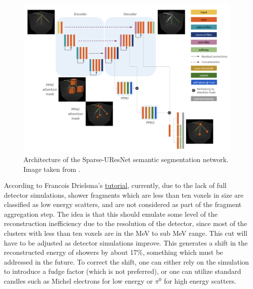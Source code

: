\documentclass[8pt]{refart}
\begin{document}
\begin{figure}[H]
    \centering
    \includegraphics[width=\linewidth]{graphics/uresnet.png}
    \caption{Architecture of the Sparse-UResNet semantic segmentation network.  Image taken from \cite{DLP1}.}
    \label{fig:my_label}
\end{figure}

According to Francois Drielsma's \href{https://indico.fnal.gov/event/50338/contributions/225763/attachments/148106/190135/Recording_day2_morning.mp4}{tutorial}, currently, due to the lack of full detector simulations, shower fragments which are less than ten voxels in size are classified as low energy scatters, and are not considered as part of the fragment aggregation step.  The idea is that this should emulate some level of the reconstruction inefficiency due to the resolution of the detector, since most of the clusters with less than ten voxels are in the MeV to sub MeV range.  This cut will have to be adjusted as detector simulations improve.  This generates a shift in the reconstructed energy of showers by about 17\%, something which must be addressed in the future.  To correct the shift, one can either rely on the simulation to introduce a fudge factor (which is not preferred), or one can utilize standard candles such as Michel electrons for low energy or $\pi^0$ for high energy scatters.
\end{document}
